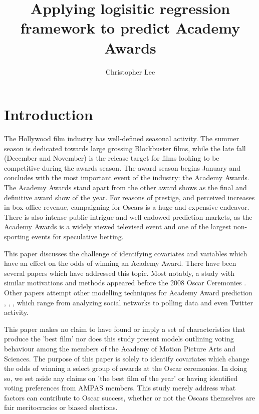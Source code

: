 \documentclass[jou,apacite]{apa6}
\title{Applying logisitic regression framework to predict Academy Awards}
\author{Christopher Lee}
\affiliation{}
\begin{document}
\maketitle    
                        
\section{Introduction}
The Hollywood film industry has well-defined seasonal activity. The summer season is dedicated towards large grossing Blockbuster films, while the late fall (December and November) is the release target for films looking to be competitive during the awards season. The award season begins January and concludes with the most important event of the industry: the Academy Awards. The Academy Awards stand apart from the other award shows as the final and definitive award show of the year. For reasons of prestige, and perceived increases in box-office revenue,  campaigning for Oscars is a huge and expensive endeavor. There is also intense public intrigue and well-endowed prediction markets, as the Academy Awards is a widely viewed televised event and one of the largest non-sporting events for speculative betting.

This paper discusses the challenge of identifying covariates and variables which have an effect on the odds of winning an Academy Award. There have been several papers which have addressed this topic. Most notably, a study with similar motivations and methods appeared before the 2008 Oscar Ceremonies \cite{pardoe08}. Other papers attempt other modelling techniques for Academy Award prediction \cite{silver13}, \cite{bernard05}, \cite{forecast13}, \cite{ghomi13} \cite{krauss08} which range from analyzing social networks to polling data and even Twitter activity.

This paper makes no claim to have found or imply a set of characteristics that produce the 'best film' nor does this study present models outlining voting behaviour among the members of the Academy of Motion Picture Arts and Sciences. The purpose of this paper is solely to identify covariates which change the odds of winning a select group of awards at the Oscar ceremonies. In doing so, we set aside any claims on 'the best film of the year' or having identified voting preferences from AMPAS members. This study merely address what factors can contribute to Oscar success, whether or not the Oscars themselves are fair meritocracies or biased elections.
\end{document}
